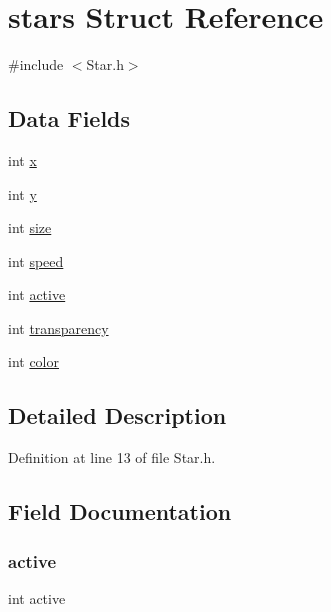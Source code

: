 \hypertarget{structstars}{}\section{stars Struct Reference}
\label{structstars}


{\ttfamily \#include $<$Star.\+h$>$}

\subsection*{Data Fields}
\begin{DoxyCompactItemize}
\item 
int \hyperlink{structstars_a6150e0515f7202e2fb518f7206ed97dc}{x}
\item 
int \hyperlink{structstars_a0a2f84ed7838f07779ae24c5a9086d33}{y}
\item 
int \hyperlink{structstars_a439227feff9d7f55384e8780cfc2eb82}{size}
\item 
int \hyperlink{structstars_a218b4f7c6cc2681a99c23a3b089d68b1}{speed}
\item 
int \hyperlink{structstars_aa5805c5e936174e5092bf7a5b78e7e64}{active}
\item 
int \hyperlink{structstars_a461e984e1aa59a77334843735aec9035}{transparency}
\item 
int \hyperlink{structstars_a0fd02fb9277ffcb35a75066ffe95e8c7}{color}
\end{DoxyCompactItemize}


\subsection{Detailed Description}


Definition at line 13 of file Star.\+h.



\subsection{Field Documentation}
\mbox{\label{structstars_aa5805c5e936174e5092bf7a5b78e7e64}} 
\subsubsection{\texorpdfstring{active}{active}}
{\footnotesize\ttfamily int active}



